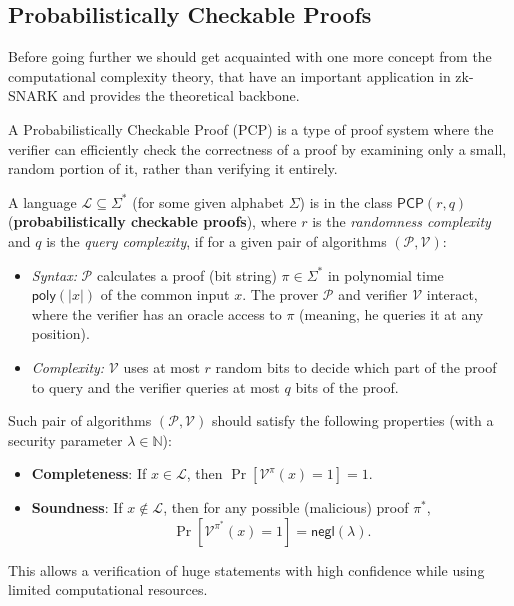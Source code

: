 \documentclass[../lecture-notes.tex]{subfiles}
\begin{document}
\subsection{Probabilistically Checkable Proofs}

Before going further we should get acquainted with one more concept from the computational 
complexity theory, that have an important application in zk-SNARK and provides the theoretical 
backbone. 

A Probabilistically Checkable Proof (PCP) is a type of proof system where the verifier can 
efficiently check the correctness of a proof by examining only a small, random portion of it, rather
than verifying it entirely. 
\begin{definition}
    A language $\mathcal{L} \subseteq \Sigma^*$ (for some given alphabet $\Sigma$) is in the class $\mathsf{PCP}(r,q)$ (\textbf{probabilistically checkable proofs}), 
    where $r$ is the \emph{randomness complexity} and $q$ is the \emph{query complexity}, 
    if for a given pair of algorithms $(\mathcal{P}, \mathcal{V})$: 
    \begin{itemize}
        \item \emph{Syntax:} $\mathcal{P}$ calculates a proof (bit string) $\pi \in \Sigma^*$ in polynomial time $\mathsf{poly}(|x|)$ of the common input $x$. The prover $\mathcal{P}$ and verifier $\mathcal{V}$ interact, where the verifier has an oracle access to $\pi$ (meaning, he queries it at any position).
        \item \emph{Complexity:} $\mathcal{V}$ uses at most $r$ random bits to decide which part of the proof to 
        query and the verifier queries at most $q$ bits of the proof.
    \end{itemize}
    
    Such pair of algorithms $(\mathcal{P}, \mathcal{V})$ should satisfy the following properties (with a security parameter $\lambda \in \mathbb{N}$):
    \begin{itemize}
        \item \textbf{Completeness}: If $x \in \mathcal{L}$, then $\Pr[\mathcal{V}^{\pi}(x) = 1] = 1$.
        \item \textbf{Soundness}: If $x \notin \mathcal{L}$, then for any possible (malicious) proof $\pi^*$, 
        \begin{equation*}
            \Pr[\mathcal{V}^{\pi^*}(x) = 1] = \mathsf{negl}(\lambda).
        \end{equation*}
    \end{itemize}
\end{definition}
This allows a verification of huge statements with high confidence while using limited computational
resources.
\end{document}
